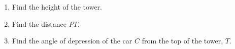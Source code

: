 \documentclass[12pt, twoside]{article}
\begin{document}
\begin{enumerate}[itemsep=0.15cm]
\begin{enumerate}[itemsep=0.1cm]
  \item[(c)] Find the height of the tower.
  \item[(d)] Find the distance $PT$.
  \item[(e)] Find the angle of depression of the car $C$ from the top of
  the tower, $T$.
\end{enumerate}


\end{enumerate}
\end{document}
